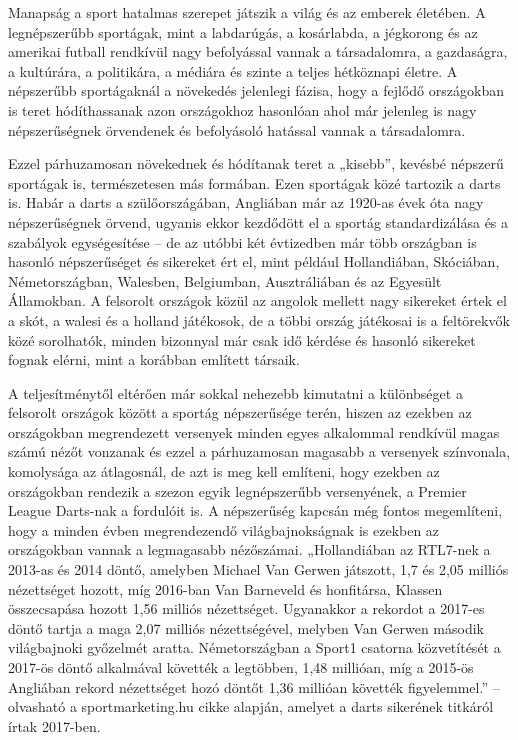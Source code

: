 
Manapság a sport hatalmas szerepet játszik a világ és az emberek életében. A legnépszerűbb 
sportágak, mint a labdarúgás, a kosárlabda, a jégkorong és az amerikai futball rendkívül 
nagy befolyással vannak a társadalomra, a gazdaságra, a kultúrára, a politikára, a médiára és 
szinte a teljes hétköznapi életre. A népszerűbb sportágaknál a növekedés jelenlegi fázisa, hogy a fejlődő országokban is teret hódíthassanak azon országokhoz hasonlóan ahol 
már jelenleg is nagy népszerűségnek örvendenek és befolyásoló hatással vannak a 
társadalomra.

Ezzel párhuzamosan növekednek és hódítanak teret a „kisebb”, kevésbé népszerű sportágak is, természetesen más formában. Ezen sportágak közé tartozik a darts is. Habár a darts a szülőországában, Angliában már az 1920-as évek óta nagy népszerűségnek örvend, ugyanis ekkor 
kezdődött el a sportág standardizálása és a szabályok egységesítése – de az utóbbi két évtizedben már több országban is hasonló népszerűséget és sikereket ért el, mint például Hollandiában, Skóciában, Németországban, Walesben, Belgiumban, 
Ausztráliában és az Egyesült Államokban. A felsorolt országok közül az angolok mellett nagy sikereket értek el a skót, a walesi és a holland játékosok, de a többi ország játékosai is a feltörekvők közé sorolhatók, minden bizonnyal már csak idő kérdése és hasonló sikereket fognak elérni, mint a korábban említett társaik. 

A teljesítménytől eltérően már sokkal nehezebb kimutatni a különbséget a felsorolt országok között a sportág népszerűsége terén, hiszen az ezekben az országokban megrendezett versenyek minden egyes alkalommal rendkívül magas számú nézőt vonzanak és ezzel a párhuzamosan magasabb a versenyek színvonala, komolysága az átlagosnál, de azt is meg kell említeni, hogy ezekben az országokban rendezik a szezon egyik legnépszerűbb versenyének, a Premier League Darts-nak a fordulóit is. A népszerűség kapcsán még fontos megemlíteni, hogy a minden évben megrendezendő világbajnokságnak is ezekben az országokban vannak a legmagasabb nézőszámai. „Hollandiában az RTL7-nek a 2013-as és 2014 döntő, amelyben Michael Van Gerwen játszott, 1,7 és 2,05 milliós nézettséget hozott, míg 2016-ban Van Barneveld és honfitársa, Klassen összecsapása hozott 1,56 milliós nézettséget. Ugyanakkor a rekordot a 2017-es döntő tartja a maga 2,07 milliós nézettségével, melyben Van Gerwen második világbajnoki 
győzelmét aratta. Németországban a Sport1 csatorna közvetítését a 2017-ös döntő alkalmával követték a legtöbben, 1,48 millióan, míg a 2015-ös Angliában rekord nézettséget hozó döntőt 1,36 millióan követték figyelemmel.” –olvasható a sportmarketing.hu cikke alapján, amelyet a darts sikerének titkáról írtak 2017-ben.
\cite{Darts}


